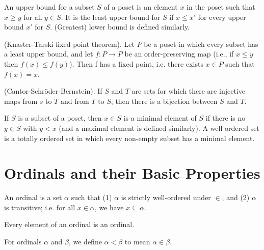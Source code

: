 \documentclass{report}
\begin{document}
\begin{definition}
  An upper bound for a subset $S$ of a poset is an element $x$ in the poset such that $x \geq y$ for all $y \in S$. It is the least upper bound for $S$ if $x \leq x'$ for every upper bound $x'$ for $S$. (Greatest) lower bound is defined similarly.
\end{definition}

\begin{theorem}
  {\normalfont (Knaster-Tarski fixed point theorem).} Let $P$ be a poset in which every subset has a least upper bound, and let $f:P \rightarrow P$ be an order-preserving map (i.e., if $x \leq y$ then $f(x) \leq f(y)$). Then f has a fixed point, i.e. there exists $x \in P$ such that $f(x) = x$.
\end{theorem}

\begin{theorem}
  {\normalfont (Cantor-Schr{\"o}der-Bernstein).} If $S$ and $T$ are sets for which there are injective maps from $s$ to $T$ and from $T$ to $S$, then there is a bijection between $S$ and $T$.
\end{theorem}

\begin{definition}
  If $S$ is a subset of a poset, then $x \in S$ is a minimal element of $S$ if there is no $y \in S$ with $y < x$ (and a maximal element is defined similarly). A well ordered set is a totally ordered set in which every non-empty subset has a minimal element.
\end{definition}

\newpage
\section{Ordinals and their Basic Properties}
\begin{definition}
  An ordinal is a set $\alpha$ such that (1) $\alpha$ is strictly well-ordered under $\in$, and (2) $\alpha$ is transitive; i.e. for all $x \in \alpha$, we have $x \subseteq \alpha$.
\end{definition}

\begin{proposition}
  Every element of an ordinal is an ordinal.
\end{proposition}

\begin{definition}
  For ordinals $\alpha$ and $\beta$, we define $\alpha < \beta$ to mean $\alpha \in \beta$.
\end{definition}
\end{document}
